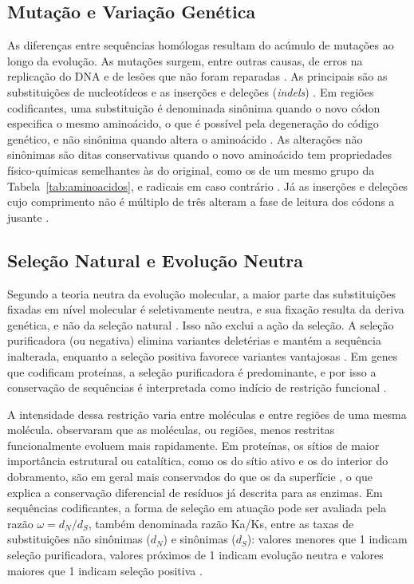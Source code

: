 \subsection{Mutação e Variação Genética}

As diferenças entre sequências homólogas resultam do acúmulo de mutações ao longo da evolução. As mutações surgem, entre outras causas, de erros na replicação do DNA e de lesões que não foram reparadas \cite{Alberts2017}. As principais são as substituições de nucleotídeos e as inserções e deleções (\textit{indels}) \cite{Alberts2017}. Em regiões codificantes, uma substituição é denominada sinônima quando o novo códon especifica o mesmo aminoácido, o que é possível pela degeneração do código genético, e não sinônima quando altera o aminoácido \cite{Hurst2002}. As alterações não sinônimas são ditas conservativas quando o novo aminoácido tem propriedades físico-químicas semelhantes às do original, como os de um mesmo grupo da Tabela~\ref{tab:aminoacidos}, e radicais em caso contrário \cite{GraurLi2000}. Já as inserções e deleções cujo comprimento não é múltiplo de três alteram a fase de leitura dos códons a jusante \cite{GraurLi2000}.

\subsection{Seleção Natural e Evolução Neutra}

Segundo a teoria neutra da evolução molecular, a maior parte das substituições fixadas em nível molecular é seletivamente neutra, e sua fixação resulta da deriva genética, e não da seleção natural \cite{Kimura1968, KingJukes1969}. Isso não exclui a ação da seleção. A seleção purificadora (ou negativa) elimina variantes deletérias e mantém a sequência inalterada, enquanto a seleção positiva favorece variantes vantajosas \cite{GraurLi2000}. Em genes que codificam proteínas, a seleção purificadora é predominante, e por isso a conservação de sequências é interpretada como indício de restrição funcional \cite{GraurLi2000}.

A intensidade dessa restrição varia entre moléculas e entre regiões de uma mesma molécula.  observaram que as moléculas, ou regiões, menos restritas funcionalmente evoluem mais rapidamente. Em proteínas, os sítios de maior importância estrutural ou catalítica, como os do sítio ativo e os do interior do dobramento, são em geral mais conservados do que os da superfície \cite{Echave2016}, o que explica a conservação diferencial de resíduos já descrita para as enzimas. Em sequências codificantes, a forma de seleção em atuação pode ser avaliada pela razão $\omega = d_N / d_S$, também denominada razão Ka/Ks, entre as taxas de substituições não sinônimas ($d_N$) e sinônimas ($d_S$): valores menores que 1 indicam seleção purificadora, valores próximos de 1 indicam evolução neutra e valores maiores que 1 indicam seleção positiva \cite{Hurst2002}.

